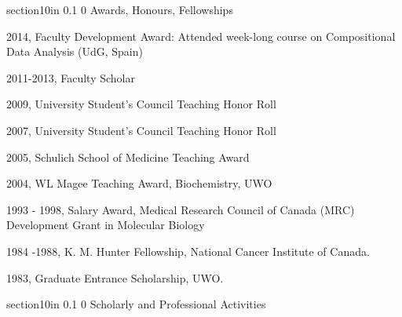 \documentclass[11pt]{article}
\makeatletter
\renewcommand\section{\@startsection
	{section}{1}{0in}%
	{0.1\baselineskip}%
	{0\baselineskip}%
	{\sffamily\bfseries\large}
}
\makeatother
\begin{document}
\section{Awards, Honours, Fellowships}
\begin{description}\itemsep=2pt
\item 2014,       Faculty Development Award: Attended week-long course on Compositional Data Analysis (UdG, Spain)
\item 2011-2013,       Faculty Scholar
\item 2009,		University Student's Council Teaching Honor Roll
\item 2007,		University Student's Council Teaching Honor Roll
\item 2005,		Schulich School of Medicine Teaching Award
\item 2004,		WL Magee Teaching Award, Biochemistry, UWO
\item 1993 - 1998,	Salary Award, Medical Research Council of Canada (MRC)\\ Development Grant in Molecular Biology
\item 1984 -1988, 	K. M. Hunter Fellowship, National Cancer Institute of Canada.
\item 1983,	       	Graduate Entrance Scholarship, UWO.
\end{description}


\section{Scholarly and Professional Activities}
\end{document}

